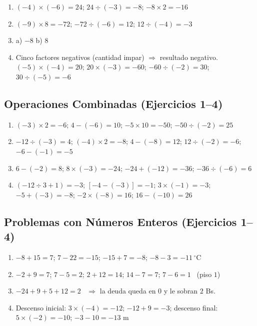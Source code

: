 \documentclass[12pt, letterpaper]{article}
\begin{document}
  \begin{enumerate}[leftmargin=*, label=\textbf{\arabic*.}]
    \item $(-4) \times (-6) = 24$; $24 \div (-3) = -8$; $-8 \times 2 = -16$
    \item $(-9) \times 8 = -72$; $-72 \div (-6) = 12$; $12 \div (-4) = -3$
    \item a) $-8$ \quad b) $8$
    \item Cinco factores negativos (cantidad impar) $\Rightarrow$ resultado negativo.
          $(-5) \times (-4) = 20$; $20 \times (-3) = -60$; $-60 \div (-2) = 30$; $30 \div (-5) = -6$
  \end{enumerate}

  \subsection*{Operaciones Combinadas (Ejercicios 1--4)}

  \begin{enumerate}[leftmargin=*, label=\textbf{\arabic*.}]
    \item $(-3) \times 2 = -6$; $4 - (-6) = 10$; $-5 \times 10 = -50$; $-50 \div (-2) = 25$
    \item $-12 \div (-3) = 4$; $(-4) \times 2 = -8$; $4 - (-8) = 12$; $12 \div (-2) = -6$; $-6 - (-1) = -5$
    \item $6 - (-2) = 8$; $8 \times (-3) = -24$; $-24 + (-12) = -36$; $-36 \div (-6) = 6$
    \item $(-12 \div 3 + 1) = -3$; $[-4 - (-3)] = -1$; $3 \times (-1) = -3$; $-5 + (-3) = -8$;
          $-2 \times (-8) = 16$; $16 - (-10) = 26$
  \end{enumerate}

  \subsection*{Problemas con Números Enteros (Ejercicios 1--4)}

  \begin{enumerate}[leftmargin=*, label=\textbf{\arabic*.}]
    \item $-8 + 15 = 7$; $7 - 22 = -15$; $-15 + 7 = -8$; $-8 - 3 = -11\,^{\circ}$C
    \item $-2 + 9 = 7$; $7 - 5 = 2$; $2 + 12 = 14$; $14 - 7 = 7$; $7 - 6 = 1$ \ (piso $1$)
    \item $-24 + 9 + 5 + 12 = 2$ \ $\Rightarrow$ la deuda queda en $0$ y le sobran $2$ Bs.
    \item Descenso inicial: $3 \times (-4) = -12$; $-12 + 9 = -3$;
          descenso final: $5 \times (-2) = -10$; $-3 - 10 = -13$ m
  \end{enumerate}
\end{document}
